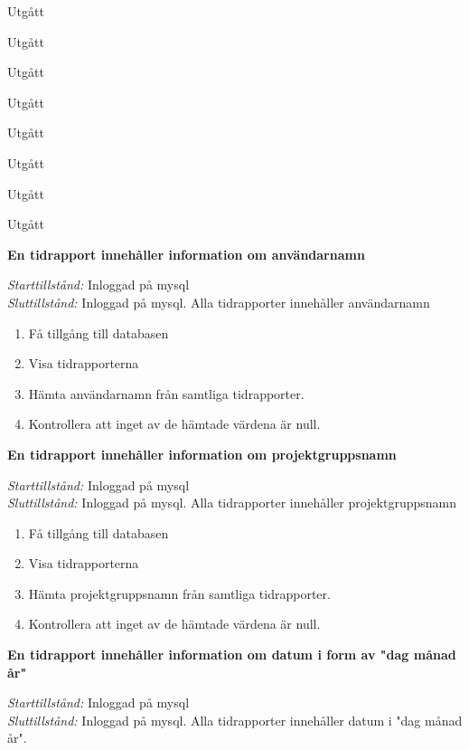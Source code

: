 \documentclass[a4paper]{article}
\begin{document}
\begin{FT}

\item Utgått
\item Utgått
\item Utgått
\item Utgått
\item Utgått
\item Utgått
\item Utgått
\item Utgått


\item
\textbf{En tidrapport innehåller information om användarnamn}

\emph{Starttillstånd:} Inloggad på mysql\\
\emph{Sluttillstånd:} Inloggad på mysql. Alla tidrapporter innehåller användarnamn\\

\begin{enumerate}
\item Få tillgång till databasen
\item Visa tidrapporterna
\item Hämta användarnamn från samtliga tidrapporter.
\item Kontrollera att inget av de hämtade värdena är null.
\end{enumerate}

\item
\textbf{En tidrapport innehåller information om projektgruppsnamn}

\emph{Starttillstånd:} Inloggad på mysql\\
\emph{Sluttillstånd:} Inloggad på mysql. Alla tidrapporter innehåller projektgruppsnamn\\

\begin{enumerate}
\item Få tillgång till databasen
\item Visa tidrapporterna
\item Hämta projektgruppsnamn från samtliga tidrapporter.
\item Kontrollera att inget av de hämtade värdena är null.
\end{enumerate}



\item
\textbf{En tidrapport innehåller information om datum i form av "dag månad år"}

\emph{Starttillstånd:} Inloggad på mysql\\
\emph{Sluttillstånd:} Inloggad på mysql. Alla tidrapporter innehåller datum i "dag månad år".\\


\end{FT}
\end{document}
